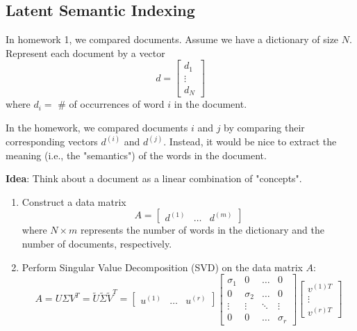 \subsection{Latent Semantic Indexing}
\begin{intuition}
    In homework 1, we compared documents. Assume we have a dictionary of size \( N \). Represent each document by a vector 
    \[
    d = \begin{bmatrix} d_1 \\ \vdots \\ d_N \end{bmatrix}
    \]
    where \( d_i = \) \# of occurrences of word \( i \) in the document.
    \vspace{1em}

    In the homework, we compared documents \( i \) and \( j \) by comparing their corresponding vectors \( d^{(i)} \) and \( d^{(j)} \). Instead, it would be nice to extract the meaning (i.e., the "semantics") of the words in the document.
    \vspace{1em}

    \textbf{Idea}: Think about a document as a linear combination of "concepts". 
    \begin{enumerate}
        \item Construct a data matrix 
        \[
        A = \begin{bmatrix} d^{(1)} & \ldots & d^{(m)} \end{bmatrix}
        \]
        where \( N \times m \) represents the number of words in the dictionary and the number of documents, respectively.
        \vspace{1em}
        
        \item Perform Singular Value Decomposition (SVD) on the data matrix \( A \):
        \[
        A = U \Sigma V^T = \tilde{U} \tilde{\Sigma} \tilde{V}^T = \begin{bmatrix} u^{(1)} & \ldots & u^{(r)} \end{bmatrix} 
        \begin{bmatrix}
        \sigma_1 & 0 & \ldots & 0 \\
        0 & \sigma_2 & \ldots & 0 \\
        \vdots & \vdots & \ddots & \vdots \\
        0 & 0 & \ldots & \sigma_r
        \end{bmatrix} 
        \begin{bmatrix} v^{(1)T} \\ \vdots \\ v^{(r)T} \end{bmatrix}
        \]
    

\end{enumerate}
\end{intuition}
